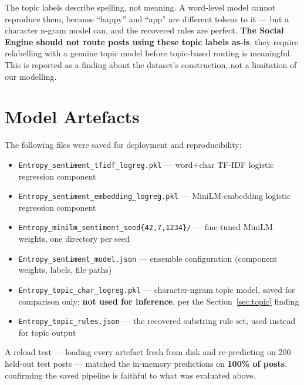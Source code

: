 \documentclass[11pt,a4paper]{article}
\begin{document}
\begin{insightbox}
The topic labels describe spelling, not meaning. A word-level model cannot reproduce them, because ``happy'' and ``app'' are different tokens to it --- but a character n-gram model can, and the recovered rules are perfect. \textbf{The Social Engine should not route posts using these topic labels as-is}; they require relabelling with a genuine topic model before topic-based routing is meaningful. This is reported as a finding about the dataset's construction, not a limitation of our modelling.
\end{insightbox}

\section{Model Artefacts}

The following files were saved for deployment and reproducibility:

\begin{itemize}[leftmargin=*, itemsep=2pt]
    \item \texttt{Entropy\_sentiment\_tfidf\_logreg.pkl} --- word+char TF-IDF logistic regression component
    \item \texttt{Entropy\_sentiment\_embedding\_logreg.pkl} --- MiniLM-embedding logistic regression component
    \item \texttt{Entropy\_minilm\_sentiment\_seed\{42,7,1234\}/} --- fine-tuned MiniLM weights, one directory per seed
    \item \texttt{Entropy\_sentiment\_model.json} --- ensemble configuration (component weights, labels, file paths)
    \item \texttt{Entropy\_topic\_char\_logreg.pkl} --- character-ngram topic model, saved for comparison only; \textbf{not used for inference}, per the Section~\ref{sec:topic} finding
    \item \texttt{Entropy\_topic\_rules.json} --- the recovered substring rule set, used instead for topic output
\end{itemize}

A reload test --- loading every artefact fresh from disk and re-predicting on 200 held-out test posts --- matched the in-memory predictions on \textbf{100\% of posts}, confirming the saved pipeline is faithful to what was evaluated above.

\end{document}
